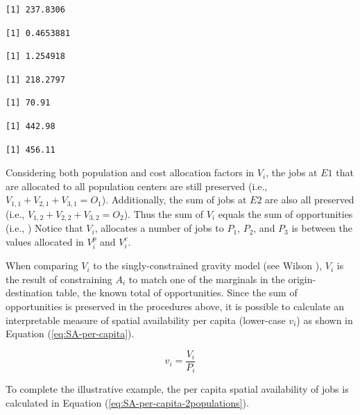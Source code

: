 \documentclass[]{elsarticle} %
\begin{document}
\begin{verbatim}
[1] 237.8306
\end{verbatim}

\begin{verbatim}
[1] 0.4653881
\end{verbatim}

\begin{verbatim}
[1] 1.254918
\end{verbatim}

\begin{verbatim}
[1] 218.2797
\end{verbatim}

\begin{verbatim}
[1] 70.91
\end{verbatim}

\begin{verbatim}
[1] 442.98
\end{verbatim}

\begin{verbatim}
[1] 456.11
\end{verbatim}

Considering both population and cost allocation factors in \(V_{i}\),
the jobs at \(E1\) that are allocated to all population centers are
still preserved (i.e., \(V_{1,1} + V_{2,1} + V_{3,1} = O_1\)).
Additionally, the sum of jobs at \(E2\) are also all preserved (i.e.,
\(V_{1,2} + V_{2,2} + V_{3,2} = O_2\)). Thus the sum of \(V_{i}\) equals
the sum of opportunities (i.e., ) Notice that \(V_{i}\), allocates a
number of jobs to \(P_1\), \(P_2\), and \(P_3\) is between the values
allocated in \(V^p_{i}\) and \(V^c_{i}\).

When comparing \(V_i\) to the singly-constrained gravity model (see
Wilson \citeyearpar{wilson1971}), \(V_i\) is the result of constraining
\(A_i\) to match one of the marginals in the origin-destination table,
the known total of opportunities. Since the sum of opportunities is
preserved in the procedures above, it is possible to calculate an
interpretable measure of spatial availability per capita (lower-case
\(v_i\)) as shown in Equation (\ref{eq:SA-per-capita}).

\begin{equation}
\label{eq:SA-per-capita}
v_i = \frac{V_i}{P_i}
\end{equation}

To complete the illustrative example, the per capita spatial
availability of jobs is calculated in Equation
(\ref{eq:SA-per-capita-2populations}).
\end{document}
